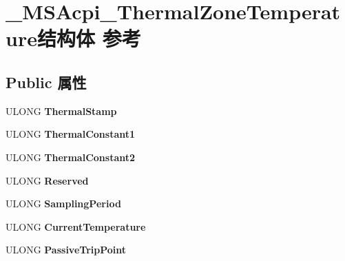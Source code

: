 \hypertarget{struct___m_s_acpi___thermal_zone_temperature}{}\section{\+\_\+\+M\+S\+Acpi\+\_\+\+Thermal\+Zone\+Temperature结构体 参考}
\label{struct___m_s_acpi___thermal_zone_temperature}
\subsection*{Public 属性}
\begin{DoxyCompactItemize}
\item 
\mbox{\label{struct___m_s_acpi___thermal_zone_temperature_a30de0003de50115a7870fca5daf827e2}} 
U\+L\+O\+NG {\bfseries Thermal\+Stamp}
\item 
\mbox{\label{struct___m_s_acpi___thermal_zone_temperature_a9048726b06a4e8e8cec209e3ba761f52}} 
U\+L\+O\+NG {\bfseries Thermal\+Constant1}
\item 
\mbox{\label{struct___m_s_acpi___thermal_zone_temperature_aedb763d07e718004e210d5e9616f2f5a}} 
U\+L\+O\+NG {\bfseries Thermal\+Constant2}
\item 
\mbox{\label{struct___m_s_acpi___thermal_zone_temperature_a367cb032f29fd33e2df0eddfdae1aeb8}} 
U\+L\+O\+NG {\bfseries Reserved}
\item 
\mbox{\label{struct___m_s_acpi___thermal_zone_temperature_a5ecdf8d3fd286718045591819f083d45}} 
U\+L\+O\+NG {\bfseries Sampling\+Period}
\item 
\mbox{\label{struct___m_s_acpi___thermal_zone_temperature_aed280fc4b1fe7dfc11c1974c24eebd00}} 
U\+L\+O\+NG {\bfseries Current\+Temperature}
\item 
\mbox{\label{struct___m_s_acpi___thermal_zone_temperature_a01f705418da44140355f94f693912fc2}} 
U\+L\+O\+NG {\bfseries Passive\+Trip\+Point}

\end{DoxyCompactItemize}
